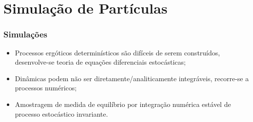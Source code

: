 

\section{Simulação de Partículas}

\begin{frame}
	\frametitle{Simulações}
	
	\begin{itemize}
		\item Processos ergóticos determinísticos são difíceis de serem construídos, desenvolve-se teoria de equações diferenciais estocásticas;
		\pause
		\item Dinâmicas podem não ser diretamente/analiticamente integráveis, recorre-se a processos numéricos;
		\pause
		\item Amostragem de medida de equilíbrio por integração numérica estável de processo estocástico invariante.
	\end{itemize}
\end{frame}

